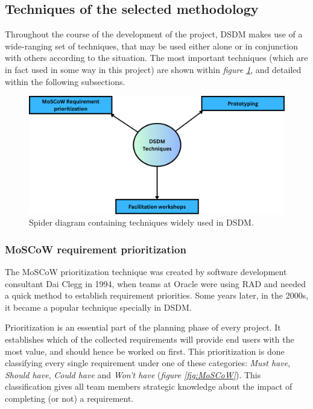 \subsection{Techniques of the selected methodology}\label{sec:DSDMTechniques}

Throughout the course of the development of the project, \acrshort{DSDM} makes use of a wide-ranging set of techniques, that may be used either alone or in conjunction with
others according to the situation. The most important techniques (which are in fact used in some way in this project) are shown within \emph{figure \ref{fig:DSDMTechniques}},
and detailed within the following subsections.

\begin{figure}[H]
    \centering
    \includegraphics[width=0.8\linewidth]{figs/dsdm-techniques.png}
    \caption{Spider diagram containing techniques widely used in \acrshort{DSDM}.}
    \label{fig:DSDMTechniques}
\end{figure}


\subsubsection{MoSCoW requirement prioritization}\label{sec:MoSCoW}

The MoSCoW prioritization technique was created by software development consultant Dai Clegg in 1994, when teams at Oracle were using \acrshort{RAD} and needed a quick method to
establish requirement priorities. Some years later, in the 2000s, it became a popular technique specially in \acrshort{DSDM}\cite{moscow}.

Prioritization is an essential part of the planning phase of every project. It establishes which of the collected requirements will provide end users with the most value, and
should hence be worked on first. This prioritization is done classifying every single requirement under one of these categories: \emph{Must have}, \emph{Should have}, \emph{Could
have} and \emph{Won't have} (\emph{figure \ref{fig:MoSCoW}}). This classification gives all team members strategic knowledge about the impact of completing (or not) a requirement.


